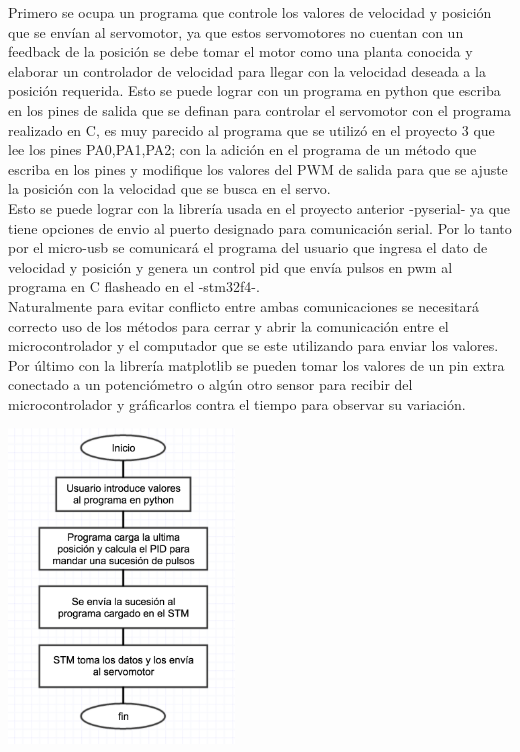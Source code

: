 \documentclass[letterpaper]{article}
\begin{document}
Primero se ocupa un programa que controle los valores de velocidad y posición que se envían al servomotor, ya que estos servomotores no cuentan con un feedback de la posición se debe tomar el motor como una planta conocida y elaborar un controlador de velocidad para llegar con la velocidad deseada a la posición requerida. Esto se puede lograr con un programa en python que escriba en los pines de salida que se definan para controlar el servomotor con el programa realizado en C, es muy parecido al programa que se utilizó en el proyecto 3 que lee los pines PA0,PA1,PA2; con la adición en el programa de un método que escriba en los pines y modifique los valores del PWM de salida para que se ajuste la posición con la velocidad que se busca en el servo.\\
Esto se puede lograr con la librería usada en el proyecto anterior -pyserial- ya que tiene opciones de envio al puerto designado para comunicación serial. Por lo tanto por el micro-usb se comunicará el programa del usuario que ingresa el dato de velocidad y posición y genera un control pid que envía pulsos en pwm al programa en C flasheado en el -stm32f4-.\\
Naturalmente para evitar conflicto entre ambas comunicaciones se necesitará correcto uso de los métodos para cerrar y abrir la comunicación entre el microcontrolador y el computador que se este utilizando para enviar los valores.\\
Por último con la librería matplotlib se pueden tomar los valores de un pin extra conectado a un potenciómetro o algún otro sensor para recibir del microcontrolador y gráficarlos contra el tiempo para observar su variación.\\

\begin{center}
\includegraphics[width=6cm]{micro.png}
\end{center}
\end{document}
